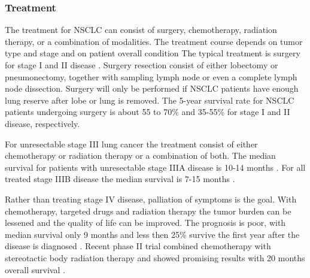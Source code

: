 \subsubsection{Treatment}

The treatment for NSCLC can consist of surgery, chemotherapy, radiation therapy, or a combination of modalities. The treatment course depends on tumor type and stage and on patient overall condition
The typical treatment is surgery for stage I and II disease \cite{Tsao2008}. Surgery resection consist of either lobectomy or pneumonectomy, together with sampling lymph node or even a complete lymph node
dissection. Surgery will only be performed if NSCLC patients have enough lung reserve after lobe or lung is removed. The 5-year survival rate for NSCLC patients undergoing surgery is about 55 to 70\% 
and 35-55\% for stage I and II disease, respectively.

For unresectable stage III lung cancer the treatment consist of either chemotherapy or radiation therapy or a combination of both. The median survival for patients with unresectable stage IIIA disease is 10-14 months \cite{Tsao2008}.
For all treated stage IIIB disease the median survival is 7-15 months \cite{Srisam2005}.

Rather than treating stage IV disease, palliation of symptoms is the goal. With chemotherapy, targeted drugs and radiation therapy the tumor burden can be lessened and the quality of life can be improved. The prognosis is poor, with
median survival only 9 months and less then 25\% survive the first year after the disease is diagnosed \cite{Tsao2008}. Recent phase II trial combined chemotherapy with stereotactic body radiation therapy and 
showed promising results with 20 months overall survival \cite{Iyengar2014}.

